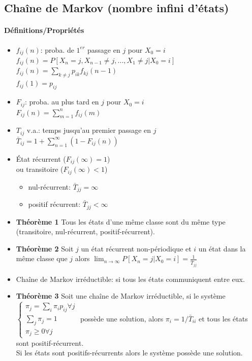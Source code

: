\documentclass[paper=a4,fontsize=8pt,pagesize,DIV=calc]{scrartcl}
\begin{document}
\begin{multicols}{3}
\section{Chaîne de Markov (nombre infini d'états)}
\paragraph{Définitions/Propriétés}
\begin{itemize}
\item $f_{ij}(n)$: proba. de $1^{er}$ passage  en $j$ pour $X_0=i$
$f_{ij}(n) = P[X_n = j,X_{n-1} \neq j, ... ,X_1\neq j|X_0 = i]$
\\$f_{ij}(n) =\sum_{k\neq j} p_{ik}f_{kj}(n - 1)$
\\ $f_{ij}(1) = p_{ij}$
\item $F_{ij}$: proba. au plus tard en $j$ pour $X_0=i$
\\$F_{ij}(n)=\sum_{m=1}^{n}f_{ij}(m)$
\item $T_{ij}$ v.a.: temps jusqu'au premier passage en $j$ 
\\$\bar{T}_{ij}=1+\sum_{n=1}^\infty (1-F_{ij}(n))$
\item État récurrent ($F_{ij}(\infty)=1$) \\ou transitoire ($F_{ij}(\infty)<1$) 
\begin{itemize}
\item nul-récurrent: $\bar{T}_{jj} =\infty$
\item positif récurrent: $\bar{T}_{jj}<\infty$
\end{itemize}
\item \textbf{Théorème 1} Tous les états d’une même classe sont du même type (transitoire, nul-récurrent, positif-récurrent).
\item \textbf{Théorème 2} Soit $j$ un état récurrent non-périodique et $i$ un état dans la même classe que $j$ alors
$\lim_{n\to\infty}P[X_n = j|X_0 = i] =\frac{1}{\bar{T}_{jj}}$
\item Chaîne de Markov irréductible: si
tous les états communiquent entre eux.
\item \textbf{Théorème 3} Soit une chaîne de Markov irréductible, si le système
$\begin{cases}\pi_j=\sum_i \pi_i p_{ij} \forall j\\ \sum_j \pi_j=1\\ \pi_j\geq 0 \forall j\end{cases}$
possède une solution, alors $\pi_i = 1/\bar{T}_{ii}$ et tous les états sont positif-récurrent.
\\ Si les états sont positifs-récurrents alors le système possède une solution.
\end{itemize}

\end{multicols}
\end{document}
